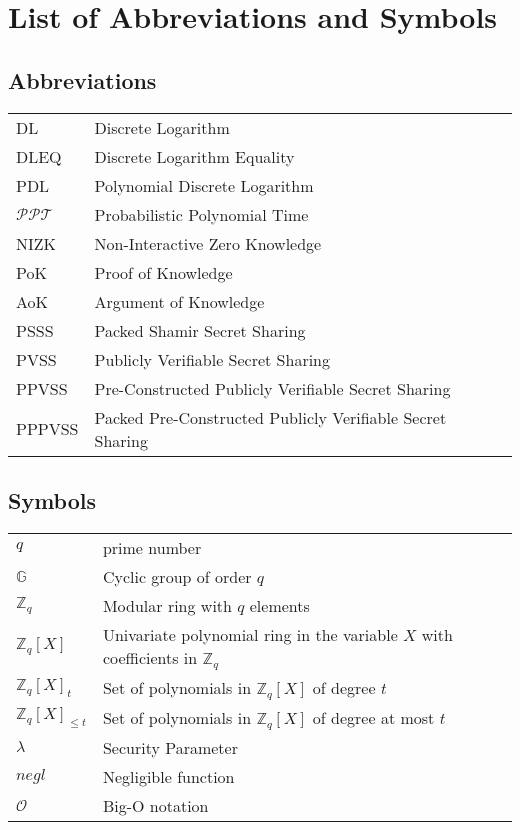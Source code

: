 \documentclass[master=mcs]{kulemt}
\begin{document}
\listoffiguresandtables
\chapter{List of Abbreviations and Symbols}
\section*{Abbreviations}
\begin{flushleft}
  \renewcommand{\arraystretch}{1.1}
  \begin{tabularx}{\textwidth}{@{}p{12mm}X@{}}
    DL & Discrete Logarithm \\
    DLEQ & Discrete Logarithm Equality \\
    PDL & Polynomial Discrete Logarithm \\
    $\mathcal{PPT}$ & Probabilistic Polynomial Time \\
    NIZK   & Non-Interactive Zero Knowledge \\
    PoK   & Proof of Knowledge \\
    AoK  & Argument of Knowledge \\
    PSSS & Packed Shamir Secret Sharing \\
    PVSS & Publicly Verifiable Secret Sharing \\
    PPVSS & Pre-Constructed Publicly Verifiable Secret Sharing \\
    PPPVSS & Packed Pre-Constructed Publicly Verifiable Secret Sharing \\
  \end{tabularx}
\end{flushleft}
\section*{Symbols}
\begin{flushleft}
  \renewcommand{\arraystretch}{1.1}
  \begin{tabularx}{\textwidth}{@{}p{12mm}X@{}}
    $q$ & prime number \\
    $\mathbb{G}$   & Cyclic group of order $q$ \\
    $\mathbb{Z}_q$   & Modular ring with $q$ elements \\
    $\mathbb{Z}_q[X]$  & Univariate polynomial ring in the variable $X$ with coefficients in $\mathbb{Z}_q$ \\
    $\mathbb{Z}_q[X]_t$ & Set of polynomials in $\mathbb{Z}_q[X]$ of degree $t$ \\
    $\mathbb{Z}_q[X]_{\leq t}$ & Set of polynomials in $\mathbb{Z}_q[X]$ of degree at most $t$ \\
    $\lambda$   & Security Parameter \\
    $negl$ & Negligible function \\
    $\mathcal{O}$ & Big-O notation \\
  \end{tabularx}
\end{flushleft}
\end{document}
